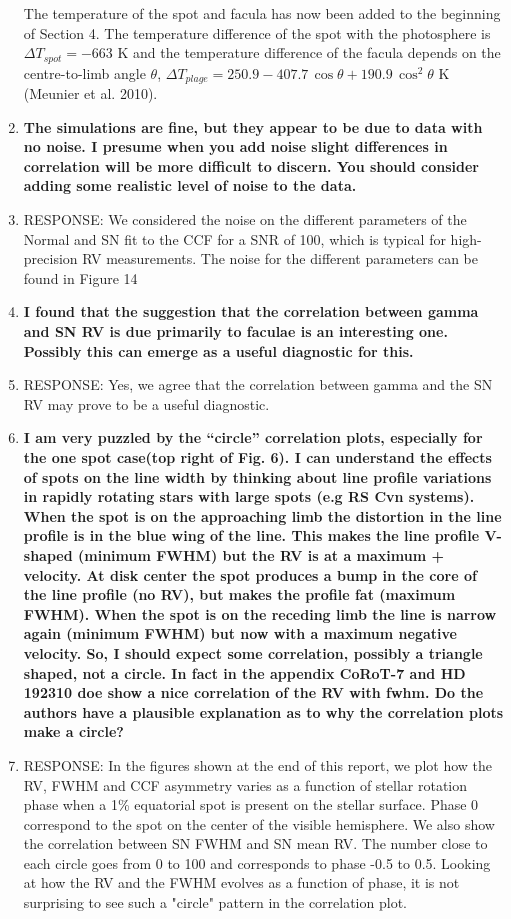 \documentclass[11pt]{article}   	%
\begin{document}
\begin{enumerate}
The temperature of the spot and facula has now been added to the beginning of Section 4. The temperature difference of the spot with the photosphere is $\Delta T_{spot} = -663$ K and the temperature difference of the facula depends on the centre-to-limb angle $\theta$,  $\Delta T_{plage} = 250.9 - 407.7\,\cos{\theta} + 190.9\,\cos^2 \theta$ K (Meunier et al. 2010).
\bigskip
%
%
\item {\bf The simulations are fine, but they appear to be due to data with no noise. I presume when you add noise slight differences in correlation will be more difficult to discern. You should consider adding some realistic level of noise to the data.}
%
\item[]  RESPONSE:  We considered the noise on the different parameters of the Normal and SN fit to the CCF for a SNR of 100, which is typical for high-precision RV measurements. The noise for the different parameters can be found in Figure 14
\bigskip
%
%
\item {\bf I found that the suggestion that the correlation between gamma and SN RV is due primarily to faculae is an interesting one. Possibly this can emerge as a useful diagnostic for this.}
%
\item[]  RESPONSE:  Yes, we agree that the correlation between gamma and the SN RV may prove to be a useful diagnostic.
\bigskip
%
%
\item {\bf I am very puzzled by the ``circle'' correlation plots, especially for the one spot case(top right of Fig. 6). I can understand the effects of spots on the line width by thinking about line profile variations in rapidly rotating stars with large spots (e.g RS Cvn systems). When the spot is on the approaching limb the distortion in the line profile is in the blue wing of the line. This makes the line profile V-shaped (minimum FWHM) but the RV is at a maximum + velocity. At disk center the spot produces a bump in the core of the line profile (no RV), but makes the profile fat (maximum FWHM). When the spot is on the receding limb the line is narrow again (minimum FWHM) but now with a maximum negative velocity. So, I should expect some correlation, possibly a triangle shaped, not a circle. In fact in the appendix CoRoT-7 and HD 192310 doe show a nice correlation of the RV with fwhm. Do the authors have a plausible explanation as to why the correlation plots make a circle?}
%
\item[]  RESPONSE:  In the figures shown at the end of this report, we plot how the RV, FWHM and CCF asymmetry varies as a function of stellar rotation phase when a 1\% equatorial spot is present on the stellar surface. Phase 0 correspond to the spot on the center of the visible hemisphere. We also show the correlation between SN FWHM and SN mean RV. The number close to each circle goes from 0 to 100 and corresponds to phase -0.5 to 0.5. Looking at how the RV and the FWHM evolves as a function of phase, it is not surprising to see such a "circle" pattern in the correlation plot.


\end{enumerate}
\end{document}
